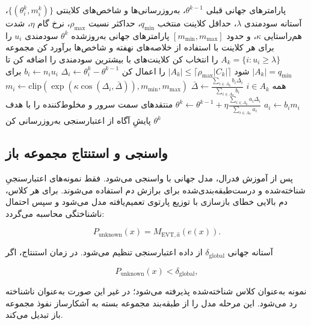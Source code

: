 \documentclass[10pt,twocolumn]{article}
\DeclareRobustCommand{\LatinTerm}[1]{\lr{{\LatinAcronymFont #1}}}
\newcommand{\FMRLAVA}{\texorpdfstring{\LatinTerm{FMRL-AVA}}{FMRL-AVA}}
\newcommand{\EVT}{\texorpdfstring{\LatinTerm{EVT}}{EVT}}
\begin{document}
\begin{algorithm}[t]
\caption{انتخاب و تجمیع آگاه از سودمندی و هم‌راستایی بردار در \FMRLAVA{}}
\begin{algorithmic}[1]
\Require پارامترهای جهانی قبلی $\theta^{k-1}$، به‌روزرسانی‌ها و شاخص‌های کلاینتی $\{(\theta_i^k,m_i^k)\}$، آستانه سودمندی $\lambda$، حداقل کلاینت منتخب $q_{\min}$، حداکثر نسبت $\rho_{\max}$، نرخ گام $\eta$، شدت هم‌راستایی $\kappa$، و حدود $[m_{\min},m_{\max}]$
\Ensure پارامترهای جهانی به‌روزشده $\theta^k$
\State سودمندی $u_i$ را برای هر کلاینت با استفاده از خلاصه‌های نهفته و شاخص‌ها برآورد کن
\State مجموعه $A_k = \{i : u_i \ge \lambda\}$ را انتخاب کن
  \State کلاینت‌های با بیشترین سودمندی را اضافه کن تا $|A_k| = q_{\min}$ شود
\EndIf
\State $|A_k| \le \lceil \rho_{\max}|C_k| \rceil$ را اعمال کن
  \State $\Delta_i \gets \theta_i^k - \theta^{k-1}$
\EndFor
\State $b_i \gets n_i u_i$ برای همه $i \in A_k$
\State $\bar{\Delta} \gets \frac{\sum_{i \in A_k} b_i\Delta_i}{\sum_{i \in A_k} b_i}$
  \State $m_i \gets \mathrm{clip}(\exp(\kappa \cos(\Delta_i,\bar{\Delta})),m_{\min},m_{\max})$
  \State $a_i \gets b_i m_i$
\EndFor
\State $\theta^k \gets \theta^{k-1} + \eta \frac{\sum_{i \in A_k} a_i\Delta_i}{\sum_{i \in A_k} a_i}$
\State منتقدهای سمت سرور و مخلوط‌کننده را با هدف پایشِ آگاه از اعتبارسنجی به‌روزرسانی کن
\State \Return $\theta^k$
\end{algorithmic}
\end{algorithm}

\subsection{واسنجی \EVT{} و استنتاج مجموعه باز}
پس از آموزش فدرال، مدل جهانی با \EVT{} واسنجی می‌شود. فقط نمونه‌های اعتبارسنجیِ شناخته‌شده و درست‌طبقه‌بندی‌شده برای برازش دم استفاده می‌شوند. برای هر کلاس، دم بالایی خطای بازسازی با توزیع پارتوی تعمیم‌یافته مدل می‌شود و سپس احتمال ناشناختگی محاسبه می‌گردد:

\[
P_{\mathrm{unknown}}(x)=M_{\mathrm{EVT},\hat{a}}(e(x)).
\]

آستانه جهانی \(\delta_{\mathrm{global}}\) از داده اعتبارسنجی تنظیم می‌شود. در زمان استنتاج، اگر

\[
P_{\mathrm{unknown}}(x)<\delta_{\mathrm{global}},
\]

نمونه به‌عنوان کلاس شناخته‌شده پذیرفته می‌شود؛ در غیر این صورت به‌عنوان ناشناخته رد می‌شود. این مرحله مدل را از طبقه‌بند مجموعه بسته به آشکارساز نفوذ مجموعه باز تبدیل می‌کند.
\end{document}
